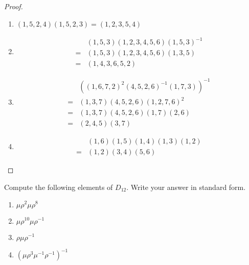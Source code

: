 \begin{proof}
    \begin{enumerate}[label={\textbf{\alph*.}}]
        \item $(1, 5, 2, 4)(1, 5, 2, 3) = (1, 2, 3, 5, 4)$
        \item \begin{align*}
                    & (1, 5, 3)(1, 2, 3, 4, 5, 6){(1, 5, 3)}^{-1} \\
                  = & (1, 5, 3)(1, 2, 3, 4, 5, 6)(1, 3, 5)        \\
                  = & (1, 4, 3, 6, 5, 2)
              \end{align*}
        \item \begin{align*}
                    & {({(1, 6, 7, 2)}^{2}{(4, 5, 2, 6)}^{-1}(1, 7, 3))}^{-1} \\
                  = & (1, 3, 7)(4, 5, 2, 6){(1, 2, 7, 6)}^{2}                 \\
                  = & (1, 3, 7)(4, 5, 2, 6)(1, 7)(2, 6)                       \\
                  = & (2, 4, 5)(3, 7)
              \end{align*}
        \item \begin{align*}
                    & (1, 6)(1, 5)(1, 4)(1, 3)(1, 2) \\
                  = & (1, 2)(3, 4)(5, 6)
              \end{align*}
    \end{enumerate}
\end{proof}

\begin{exercise}
    Compute the following elements of $D_{12}$. Write your answer in standard form.
    \begin{enumerate}[label={\textbf{\alph*.}}]
        \item $\mu{\rho}^{2}\mu{\rho}^{8}$
        \item $\mu{\rho}^{10}\mu{\rho}^{-1}$
        \item $\rho\mu{\rho}^{-1}$
        \item ${(\mu{\rho}^{3}{\mu}^{-1}{\rho}^{-1})}^{-1}$
    \end{enumerate}
\end{exercise}

